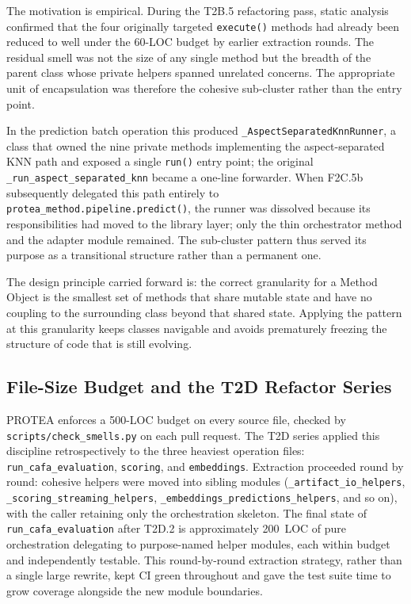The motivation is empirical. During the T2B.5 refactoring pass, static
analysis confirmed that the four originally targeted \texttt{execute()}
methods had already been reduced to well under the 60-LOC budget by earlier
extraction rounds. The residual smell was not the size of any single method
but the breadth of the parent class whose private helpers spanned unrelated
concerns. The appropriate unit of encapsulation was therefore the cohesive
sub-cluster rather than the entry point.

In the prediction batch operation this produced \texttt{\_AspectSeparatedKnnRunner},
a class that owned the nine private methods implementing the aspect-separated
KNN path and exposed a single \texttt{run()} entry point; the original
\texttt{\_run\_aspect\_separated\_knn} became a one-line forwarder. When
F2C.5b subsequently delegated this path entirely to
\texttt{protea\_method.pipeline.predict()}, the runner was dissolved because
its responsibilities had moved to the library layer; only the thin orchestrator
method and the adapter module remained. The sub-cluster pattern thus served its
purpose as a transitional structure rather than a permanent one.

The design principle carried forward is: the correct granularity for a Method
Object is the smallest set of methods that share mutable state and have no
coupling to the surrounding class beyond that shared state. Applying the
pattern at this granularity keeps classes navigable and avoids prematurely
freezing the structure of code that is still evolving.

\subsection{File-Size Budget and the T2D Refactor Series}
\label{subsec:t2d-refactor}

PROTEA enforces a 500-LOC budget on every source file, checked by
\texttt{scripts/check\_smells.py} on each pull request. The T2D series applied
this discipline retrospectively to the three heaviest operation files:
\texttt{run\_cafa\_evaluation}, \texttt{scoring}, and \texttt{embeddings}.
Extraction proceeded round by round: cohesive helpers were moved into sibling
modules (\texttt{\_artifact\_io\_helpers}, \texttt{\_scoring\_streaming\_helpers},
\texttt{\_embeddings\_predictions\_helpers}, and so on), with the caller retaining
only the orchestration skeleton. The final state of
\texttt{run\_cafa\_evaluation} after T2D.2 is approximately 200~LOC of pure
orchestration delegating to purpose-named helper modules, each within budget
and independently testable. This round-by-round extraction strategy, rather than
a single large rewrite, kept CI green throughout and gave the test suite time to
grow coverage alongside the new module boundaries.

